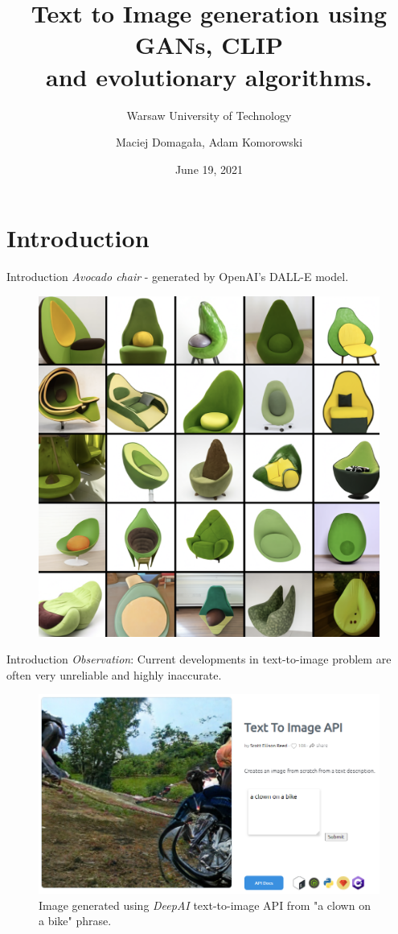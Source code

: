 \documentclass[t]{beamer}
\title{Text to Image generation using GANs,  CLIP  \\ and evolutionary algorithms.}
\subtitle{Warsaw University of Technology}
\author{Maciej Domagała, Adam Komorowski}
\date{June 19, 2021}
\begin{document}
\begin{frame}
\titlepage
\end{frame}

\section{Introduction}

\begin{frame}{Introduction}
\textit{Avocado chair} - generated by OpenAI's DALL-E model.
\begin{figure}[ht!]
    \centering
    \includegraphics[scale=0.2]{dalle_avocado.png}
\end{figure} 
\end{frame}

\begin{frame}{Introduction}
\textit{Observation}: \newline
Current developments in text-to-image problem are often very unreliable and highly inaccurate.
\begin{figure}[ht!]
    \centering
    \includegraphics[scale=0.2]{deepai.PNG}
    \caption{Image generated using \textit{DeepAI} text-to-image API from "a clown on a
bike" phrase.}
\end{figure} 
\end{frame}
\end{document}
